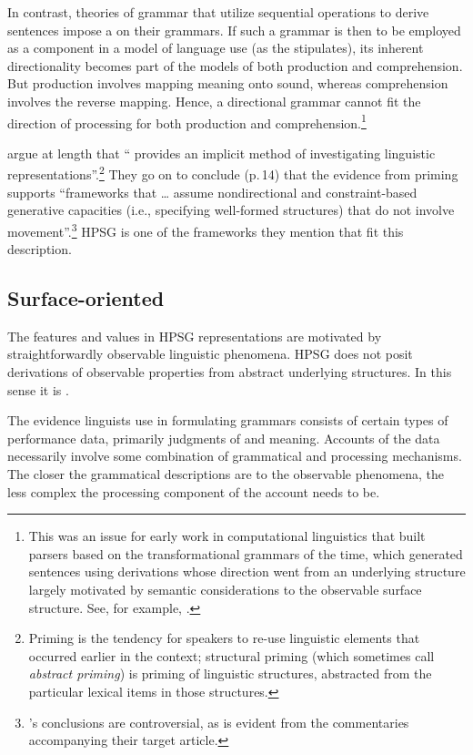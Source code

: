 \documentclass[output=paper
	        ,collection
	        ,collectionchapter
 	        ,biblatex
                ,babelshorthands
                ,newtxmath
                ,draftmode
                ,colorlinks, citecolor=brown
]{langscibook}
\begin{document}
In contrast, theories of grammar that utilize sequential operations to derive sentences impose a  on their grammars.  If such a grammar is then to be employed as a component in a model of language use (as the  stipulates), its inherent directionality becomes part of the models of both production and comprehension.  But production involves mapping meaning onto sound, whereas comprehension involves the reverse mapping.  Hence, a directional grammar cannot fit the direction of processing for both production and comprehension.\footnote{This was an issue for early work in computational linguistics that built parsers based on the transformational grammars of the time, which generated sentences using derivations whose direction went from an underlying structure largely motivated by semantic considerations to the observable surface structure.  See, for example, \citet{HobbsGrishman75}.}  

\citet{BraniganPickering2017} argue at length that `` provides an implicit method of investigating linguistic representations''.\footnote{Priming is the tendency for speakers to re-use linguistic elements that occurred earlier in the context; structural priming (which \citeauthor{BraniganPickering2017} sometimes call \emph{abstract priming}) is priming of linguistic structures, abstracted from the particular lexical items in those structures.}  They go on to conclude (p.\,14) that the evidence from priming supports ``frameworks that \ldots{} assume nondirectional and constraint-based generative capacities (i.e., specifying well-formed structures) that do not involve movement''.\footnote{\citeauthor{BraniganPickering2017}'s conclusions are controversial, as is evident from the commentaries accompanying their target article.}  HPSG is one of the frameworks they mention that fit this description.   

\subsection{Surface-oriented}

The features and values in HPSG representations are motivated by straightforwardly observable linguistic phenomena. HPSG does not posit derivations of observable properties from abstract
underlying structures.  In this sense it is .

The evidence linguists use in formulating grammars consists of certain types of performance data, primarily judgments of  and meaning.  Accounts of the data necessarily involve some
combination of grammatical and processing mechanisms.  The closer the grammatical descriptions are to the observable phenomena, the less complex the processing component of the account needs to be.
\end{document}
